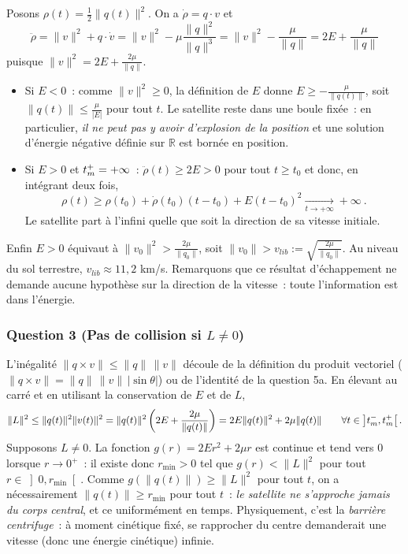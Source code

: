 
Posons \(\rho(t) = \frac{1}{2}\|q(t)\|^2\). On a \(\dot\rho = q\cdot v\)
et \[
\ddot \rho = \|v\|^2 + q\cdot \dot v = \|v\|^2 - \mu\frac{\|q\|^2}{\|q\|^3} = \|v\|^2 - \frac{\mu}{\|q\|} = 2E + \frac{\mu}{\|q\|}
\] puisque \(\|v\|^2 = 2E + \frac{2\mu}{\|q\|}\).

\begin{itemize}
\item
  Si \(E<0\)~: comme \(\|v\|^2\geq 0\), la définition de \(E\) donne
  \(E\geq -\frac{\mu}{\|q(t)\|}\), soit \(\|q(t)\|\leq \frac{\mu}{|E|}\)
  pour tout \(t\). Le satellite reste dans une boule fixée~: en
  particulier, \emph{il ne peut pas y avoir d'explosion de la position}
  et une solution d'énergie négative définie sur \(\mathbb{R}\) est
  bornée en position.
\item
  Si \(E>0\) et \(t_m^+=+\infty\)~: \(\ddot\rho(t) \geq 2E>0\) pour tout
  \(t\geq t_0\) et donc, en intégrant deux fois, \[
  \rho(t) \geq \rho(t_0) + \dot\rho(t_0)(t-t_0) + E (t-t_0)^2 \xrightarrow[t\to+\infty]{} +\infty \ .
  \] Le satellite part à l'infini quelle que soit la direction de sa
  vitesse initiale.
\end{itemize}

Enfin \(E>0\) équivaut à \(\|v_0\|^2 > \frac{2\mu}{\|q_0\|}\), soit
\(\|v_0\| > v_{lib} := \sqrt{\frac{2\mu}{\|q_0\|}}\). Au niveau du sol
terrestre, \(v_{lib}\approx 11{,}2\) km/s. Remarquons que ce résultat
d'échappement ne demande aucune hypothèse sur la direction de la
vitesse~: toute l'information est dans l'énergie.

\hypertarget{answer-kepler-3}{%
\subsubsection*{Question 3 (Pas de collision si \texorpdfstring{\(L\neq
0\)}{L non nul})}\label{answer-kepler-3}}


L'inégalité \(\|q\times v\|\leq \|q\|\,\|v\|\) découle de la définition
du produit vectoriel (\(\|q\times v\| = \|q\|\,\|v\|\,|\sin\theta|\)) ou
de l'identité de la question 5a. En élevant au carré et en utilisant la
conservation de \(E\) et de \(L\), \[
\|L\|^2 \leq \|q(t)\|^2\|v(t)\|^2 = \|q(t)\|^2\left(2E+\frac{2\mu}{\|q(t)\|}\right) = 2E\|q(t)\|^2 + 2\mu\|q(t)\| \qquad \forall t\in\left]t_m^-,t_m^+\right[ .
\] Supposons \(L\neq 0\). La fonction \(g(r) = 2Er^2+2\mu r\) est
continue et tend vers 0 lorsque \(r\to 0^+\)~: il existe donc
\(r_{\min}>0\) tel que \(g(r) < \|L\|^2\) pour tout
\(r\in\left]0,r_{\min}\right[\). Comme \(g(\|q(t)\|)\geq \|L\|^2\) pour
tout \(t\), on a nécessairement \(\|q(t)\|\geq r_{\min}\) pour tout
\(t\)~: \emph{le satellite ne s'approche jamais du corps central}, et ce
uniformément en temps. Physiquement, c'est la \emph{barrière
centrifuge}~: à moment cinétique fixé, se rapprocher du centre
demanderait une vitesse (donc une énergie cinétique) infinie.

